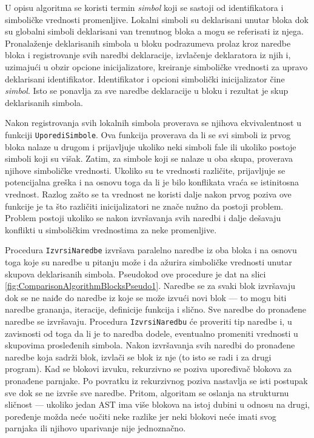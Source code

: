 U opisu algoritma se koristi termin \emph{simbol} koji se sastoji od identifikatora i simboličke vrednosti promenljive. Lokalni simboli su deklarisani unutar bloka dok su globalni simboli deklarisani van trenutnog bloka a mogu se referisati iz njega. Pronalaženje deklarisanih simbola u bloku podrazumeva prolaz kroz naredbe bloka i registrovanje svih naredbi deklaracije, izvlačenje deklaratora iz njih i, uzimajući u obzir opcione inicijalizatore, kreiranje simboličke vrednosti za upravo deklarisani identifikator. Identifikator i opcioni simbolički inicijalizator čine \emph{simbol}. Isto se ponavlja za sve naredbe deklaracije u bloku i rezultat je skup deklarisanih simbola.

Nakon registrovanja svih lokalnih simbola proverava se njihova ekvivalentnost u funkciji \texttt{UporediSimbole}. Ova funkcija proverava da li se svi simboli iz prvog bloka nalaze u drugom i prijavljuje ukoliko neki simboli fale ili ukoliko postoje simboli koji su višak. Zatim, za simbole koji se nalaze u oba skupa, proverava njihove simboličke vrednosti. Ukoliko su te vrednosti različite, prijavljuje se potencijalna greška i na osnovu toga da li je bilo konflikata vraća se istinitosna vrednost. Razlog zašto se ta vrednost ne koristi dalje nakon prvog poziva ove funkcije je ta što različiti inicijalizatori ne znače nužno da postoji problem. Problem postoji ukoliko se nakon izvršavanja svih naredbi i dalje dešavaju konflikti u simboličkim vrednostima za neke promenljive. 

Procedura \texttt{IzvrsiNaredbe} izvršava paralelno naredbe iz oba bloka i na osnovu toga koje su naredbe u pitanju može i da ažurira simboličke vrednosti unutar skupova deklarisanih simbola. Pseudokod ove procedure je dat na slici \ref{fig:ComparisonAlgorithmBlocksPseudo1}. Naredbe se za svaki blok izvršavaju dok se ne naiđe do naredbe iz koje se može izvući novi blok --- to mogu biti naredbe grananja, iteracije, definicije funkcija i slično. Sve naredbe do pronađene naredbe se izvršavaju. Procedura \texttt{IzvrsiNaredbu} će proveriti tip naredbe i, u zavisnosti od toga da li je to naredba dodele, eventualno promeniti vrednosti u skupovima prosleđenih simbola. Nakon izvršavanja svih naredbi do pronađene naredbe koja sadrži blok, izvlači se blok iz nje (to isto se radi i za drugi program). Kad se blokovi izvuku, rekurzivno se poziva upoređivač blokova za pronađene parnjake. Po povratku iz rekurzivnog poziva nastavlja se isti postupak sve dok se ne izvrše sve naredbe. Pritom, algoritam se oslanja na strukturnu sličnost --- ukoliko jedan AST ima više blokova na istoj dubini u odnosu na drugi, poređenje možda neće uočiti neke razlike jer neki blokovi neće imati svog parnjaka ili njihovo uparivanje nije jednoznačno.

